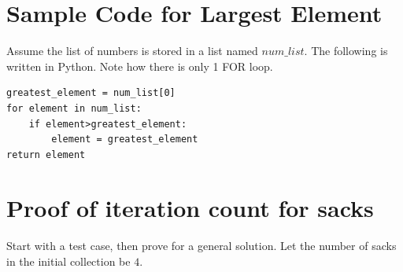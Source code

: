 \documentclass[10pt,journal,compsoc]{IEEEtran}
\begin{document}
%


\appendices
\section{Sample Code for Largest Element}
Assume the list of numbers is stored in a list named $num\_list$. The following is written in Python. Note how there is only 1 FOR loop.
\begin{lstlisting}
greatest_element = num_list[0]
for element in num_list:
	if element>greatest_element:
		element = greatest_element
return element

\end{lstlisting}

\section{Proof of iteration count for sacks}
Start with a test case, then prove for a general solution. 
Let the number of sacks in the initial collection be $4$. 
\end{document}
